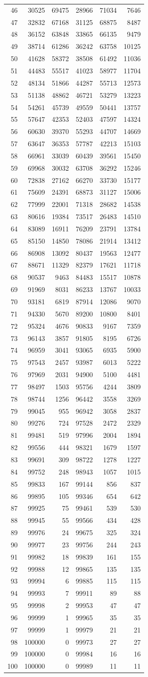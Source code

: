 \documentclass[]{article}
\begin{document}
\begin{longtable}[]{@{}rrrrrr@{}}
46 & 30525 & 69475 & 28966 & 71034 & 7646\tabularnewline
47 & 32832 & 67168 & 31125 & 68875 & 8487\tabularnewline
48 & 36152 & 63848 & 33865 & 66135 & 9479\tabularnewline
49 & 38714 & 61286 & 36242 & 63758 & 10125\tabularnewline
50 & 41628 & 58372 & 38508 & 61492 & 11036\tabularnewline
51 & 44483 & 55517 & 41023 & 58977 & 11704\tabularnewline
52 & 48134 & 51866 & 44287 & 55713 & 12573\tabularnewline
53 & 51138 & 48862 & 46721 & 53279 & 13223\tabularnewline
54 & 54261 & 45739 & 49559 & 50441 & 13757\tabularnewline
55 & 57647 & 42353 & 52403 & 47597 & 14324\tabularnewline
56 & 60630 & 39370 & 55293 & 44707 & 14669\tabularnewline
57 & 63647 & 36353 & 57787 & 42213 & 15103\tabularnewline
58 & 66961 & 33039 & 60439 & 39561 & 15450\tabularnewline
59 & 69968 & 30032 & 63708 & 36292 & 15246\tabularnewline
60 & 72838 & 27162 & 66270 & 33730 & 15177\tabularnewline
61 & 75609 & 24391 & 68873 & 31127 & 15006\tabularnewline
62 & 77999 & 22001 & 71318 & 28682 & 14538\tabularnewline
63 & 80616 & 19384 & 73517 & 26483 & 14510\tabularnewline
64 & 83089 & 16911 & 76209 & 23791 & 13784\tabularnewline
65 & 85150 & 14850 & 78086 & 21914 & 13412\tabularnewline
66 & 86908 & 13092 & 80437 & 19563 & 12477\tabularnewline
67 & 88671 & 11329 & 82379 & 17621 & 11718\tabularnewline
68 & 90537 & 9463 & 84483 & 15517 & 10878\tabularnewline
69 & 91969 & 8031 & 86233 & 13767 & 10033\tabularnewline
70 & 93181 & 6819 & 87914 & 12086 & 9070\tabularnewline
71 & 94330 & 5670 & 89200 & 10800 & 8401\tabularnewline
72 & 95324 & 4676 & 90833 & 9167 & 7359\tabularnewline
73 & 96143 & 3857 & 91805 & 8195 & 6726\tabularnewline
74 & 96959 & 3041 & 93065 & 6935 & 5900\tabularnewline
75 & 97543 & 2457 & 93987 & 6013 & 5222\tabularnewline
76 & 97969 & 2031 & 94900 & 5100 & 4481\tabularnewline
77 & 98497 & 1503 & 95756 & 4244 & 3809\tabularnewline
78 & 98744 & 1256 & 96442 & 3558 & 3269\tabularnewline
79 & 99045 & 955 & 96942 & 3058 & 2837\tabularnewline
80 & 99276 & 724 & 97528 & 2472 & 2329\tabularnewline
81 & 99481 & 519 & 97996 & 2004 & 1894\tabularnewline
82 & 99556 & 444 & 98321 & 1679 & 1597\tabularnewline
83 & 99691 & 309 & 98722 & 1278 & 1227\tabularnewline
84 & 99752 & 248 & 98943 & 1057 & 1015\tabularnewline
85 & 99833 & 167 & 99144 & 856 & 837\tabularnewline
86 & 99895 & 105 & 99346 & 654 & 642\tabularnewline
87 & 99925 & 75 & 99461 & 539 & 530\tabularnewline
88 & 99945 & 55 & 99566 & 434 & 428\tabularnewline
89 & 99976 & 24 & 99675 & 325 & 324\tabularnewline
90 & 99977 & 23 & 99756 & 244 & 243\tabularnewline
91 & 99982 & 18 & 99839 & 161 & 155\tabularnewline
92 & 99988 & 12 & 99865 & 135 & 135\tabularnewline
93 & 99994 & 6 & 99885 & 115 & 115\tabularnewline
94 & 99993 & 7 & 99911 & 89 & 88\tabularnewline
95 & 99998 & 2 & 99953 & 47 & 47\tabularnewline
96 & 99999 & 1 & 99965 & 35 & 35\tabularnewline
97 & 99999 & 1 & 99979 & 21 & 21\tabularnewline
98 & 100000 & 0 & 99973 & 27 & 27\tabularnewline
99 & 100000 & 0 & 99984 & 16 & 16\tabularnewline
100 & 100000 & 0 & 99989 & 11 & 11\tabularnewline
\bottomrule
\end{longtable}
\end{document}

